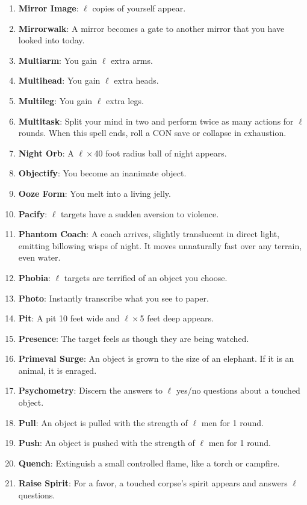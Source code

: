 \documentclass[twoside]{article}
\begin{document}
\begin{enumerate}[nosep]
\item \textbf{Mirror Image}: $\ell$ copies of yourself appear.
\item \textbf{Mirrorwalk}: A mirror becomes a gate to another mirror that you have looked into today.
\item \textbf{Multiarm}: You gain $\ell$ extra arms.
\item \textbf{Multihead}: You gain $\ell$ extra heads.
\item \textbf{Multileg}: You gain $\ell$ extra legs.
\item \textbf{Multitask}: Split your mind in two and perform twice as many actions for $\ell$ rounds. When this spell ends, roll a CON save or collapse in exhaustion.
\item \textbf{Night Orb}: A $\ell\times$40 foot radius ball of night appears.
\item \textbf{Objectify}: You become an inanimate object.
\item \textbf{Ooze Form}: You melt into a living jelly.
\item \textbf{Pacify}: $\ell$ targets have a sudden aversion to violence.
\item \textbf{Phantom Coach}: A coach arrives, slightly translucent in direct light, emitting billowing wisps of night. It moves unnaturally fast over any terrain, even water.
\item \textbf{Phobia}: $\ell$ targets are terrified of an object you choose.
\item \textbf{Photo}: Instantly transcribe what you see to paper.
\item \textbf{Pit}: A pit 10 feet wide and $\ell\times$5 feet deep appears.
\item \textbf{Presence}: The target feels as though they are being watched.
\item \textbf{Primeval Surge}: An object is grown to the size of an elephant. If it is an animal, it is enraged.
\item \textbf{Psychometry}: Discern the answers to $\ell$ yes/no questions about a touched object.
\item \textbf{Pull}: An object is pulled with the strength of $\ell$ men for 1 round.
\item \textbf{Push}: An object is pushed with the strength of $\ell$ men for 1 round.
\item \textbf{Quench}: Extinguish a small controlled flame, like a torch or campfire.
\item \textbf{Raise Spirit}: For a favor, a touched corpse's spirit appears and answers $\ell$ questions.

\end{enumerate}
\end{document}
